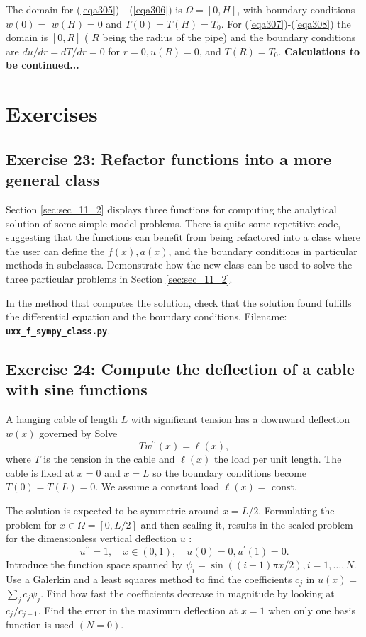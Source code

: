 \documentclass[../main.tex]{subfiles}
\begin{document}
		\noindent The domain for (\ref{eqa305}) - (\ref{eqa306}) is $\Omega=[0, H]$, with boundary conditions $w(0)=$ $w(H)=0$ and $T(0)=T(H)=T_{0}$. For (\ref{eqa307})-(\ref{eqa308}) the domain is $[0, R]$ ( $R$ being the radius of the pipe) and the boundary conditions are $d u / d r=d T / d r=0$ for $r=0, u(R)=0$, and $T(R)=T_{0} .$\smallbreak
		\textbf{Calculations to be continued...}
	
\chapter{Exercises}
	\section*{Exercise 23: Refactor functions into a more general class}
		\label{sec:sec_21_23}
		Section \ref{sec:sec_11_2} displays three functions for computing the analytical solution of some simple model problems. There is quite some repetitive code, suggesting that the functions can benefit from being refactored into a class where the user can define the $f(x), a(x)$, and the boundary conditions in particular methods in subclasses. Demonstrate how the new class can be used to solve the three particular problems in Section \ref{sec:sec_11_2}.
		
		In the method that computes the solution, check that the solution found fulfills the differential equation and the boundary conditions. 
		Filename: \textbf{\texttt{uxx\_f\_sympy\_class.py}}.\bigbreak
	\section*{Exercise 24: Compute the deflection of a cable with sine functions}
		\label{sec:sec_21_24}
		\noindent A hanging cable of length $L$ with significant tension has a downward deflection $w(x)$ governed by
		Solve
		$$
		T w^{\prime \prime}(x)=\ell(x),
		$$
		where $T$ is the tension in the cable and $\ell(x)$ the load per unit length. The cable is fixed at $x=0$ and $x=L$ so the boundary conditions become $T(0)=T(L)=0$. We assume a constant load $\ell(x)=$ const.
		
		The solution is expected to be symmetric around $x=L / 2$. Formulating the problem for $x \in \Omega=[0, L / 2]$ and then scaling it, results in the scaled problem for the dimensionless vertical deflection $u$ :
		$$
		u^{\prime \prime}=1, \quad x \in(0,1), \quad u(0)=0, u^{\prime}(1)=0 .
		$$
		Introduce the function space spanned by $\psi_{i}=\sin ((i+1) \pi x / 2), i=1, \ldots, N$. Use a Galerkin and a least squares method to find the coefficients $c_{j}$ in $u(x)=$ $\sum_{j} c_{j} \psi_{j}$. Find how fast the coefficients decrease in magnitude by looking at $c_{j} / c_{j-1}$. Find the error in the maximum deflection at $x=1$ when only one basis function is used $(N=0)$.
		
\end{document}

